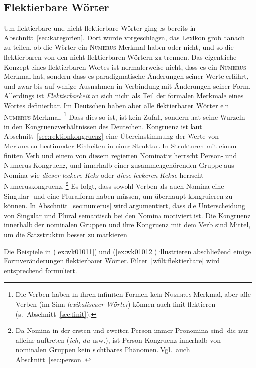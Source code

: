 \subsection{Flektierbare Wörter}

\label{sec:flektierbarewoerterwortklassen}


Um flektierbare und nicht flektierbare Wörter ging es bereits in Abschnitt~\ref{sec:kategorien}.
Dort wurde vorgeschlagen, das Lexikon grob danach zu teilen, ob die Wörter ein \textsc{Numerus}-Merkmal haben oder nicht, und so die flektierbaren von den nicht flektierbaren Wörtern zu trennen.
Das eigentliche Konzept eines flektierbaren Wortes ist normalerweise nicht, dass es ein \textsc{Numerus}-Merkmal hat, sondern dass es paradigmatische Änderungen seiner Werte erfährt, und zwar bis auf wenige Ausnahmen in Verbindung mit Änderungen seiner Form.
Allerdings ist \textit{Flektierbarkeit} an sich nicht als Teil der formalen Merkmale eines Wortes definierbar.
Im Deutschen haben aber alle flektierbaren Wörter ein \textsc{Numerus}-Merkmal.%
\footnote{Die Verben haben in ihren infiniten Formen kein \textsc{Numerus}-Merkmal, aber alle Verben (im Sinn \textit{lexikalischer Wörter}) können auch finit flektieren (s.\ Abschnitt~\ref{sec:finit}).}
Dass dies so ist, ist kein Zufall, sondern hat seine Wurzeln in den Kongruenzverhältnissen des Deutschen.
Kongruenz ist laut Abschnitt~\ref{sec:rektionkongruenz} eine Übereinstimmung der Werte von Merkmalen bestimmter Einheiten in einer Struktur.
In Strukturen mit einem finiten Verb und einem von diesem regierten Nominativ herrscht Person- und Numerus-Kongruenz, und innerhalb einer zusammengehörenden Gruppe aus Nomina wie \textit{dieser leckere Keks} oder \textit{diese leckeren Kekse} herrscht Numeruskongruenz.%
\footnote{Da Nomina in der ersten und zweiten Person immer Pronomina sind, die nur alleine auftreten (\textit{ich}, \textit{du} usw.), ist Person-Kongruenz innerhalb von nominalen Gruppen kein sichtbares Phänomen.
Vgl.\ auch Abschnitt~\ref{sec:person}.}
Es folgt, dass sowohl Verben als auch Nomina eine Singular- und eine Pluralform haben müssen, um überhaupt kongruieren zu können.
In Abschnitt~\ref{sec:numerus} wird argumentiert, dass die Unterscheidung von Singular und Plural semantisch bei den Nomina motiviert ist.
Die Kongruenz innerhalb der nominalen Gruppen und ihre Kongruenz mit dem Verb sind Mittel, um die Satzstruktur besser zu markieren.

Die Beispiele in (\ref{ex:wk01011}) und (\ref{ex:wk01012}) illustrieren abschließend einige Formveränderungen flektierbarer Wörter.
Filter~\ref{wfilt:flektierbare} wird entsprechend formuliert.

